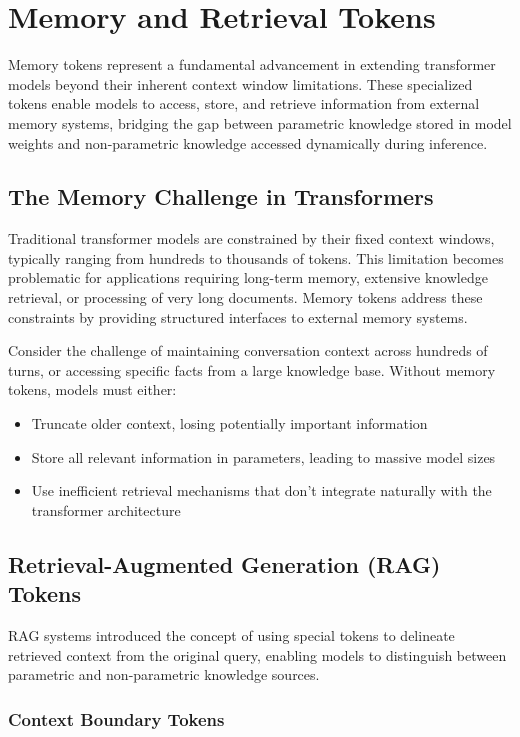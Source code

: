 \section{Memory and Retrieval Tokens}

Memory tokens represent a fundamental advancement in extending transformer models beyond their inherent context window limitations. These specialized tokens enable models to access, store, and retrieve information from external memory systems, bridging the gap between parametric knowledge stored in model weights and non-parametric knowledge accessed dynamically during inference.

\subsection{The Memory Challenge in Transformers}

Traditional transformer models are constrained by their fixed context windows, typically ranging from hundreds to thousands of tokens. This limitation becomes problematic for applications requiring long-term memory, extensive knowledge retrieval, or processing of very long documents. Memory tokens address these constraints by providing structured interfaces to external memory systems.

Consider the challenge of maintaining conversation context across hundreds of turns, or accessing specific facts from a large knowledge base. Without memory tokens, models must either:
\begin{itemize}
\item Truncate older context, losing potentially important information
\item Store all relevant information in parameters, leading to massive model sizes
\item Use inefficient retrieval mechanisms that don't integrate naturally with the transformer architecture
\end{itemize}

\subsection{Retrieval-Augmented Generation (RAG) Tokens}

RAG systems introduced the concept of using special tokens to delineate retrieved context from the original query, enabling models to distinguish between parametric and non-parametric knowledge sources.

\subsubsection{Context Boundary Tokens}

